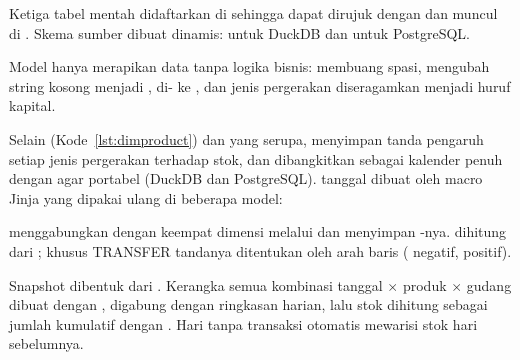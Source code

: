  Ketiga tabel mentah didaftarkan di  sehingga dapat dirujuk dengan  dan muncul di . Skema sumber dibuat dinamis:  untuk DuckDB dan  untuk PostgreSQL.


 Model  hanya merapikan data tanpa logika bisnis:  membuang spasi,  mengubah string kosong menjadi ,  di- ke , dan jenis pergerakan diseragamkan menjadi huruf kapital.


 Selain  (Kode~\ref{lst:dimproduct}) dan  yang serupa,  menyimpan tanda pengaruh setiap jenis pergerakan terhadap stok, dan  dibangkitkan sebagai kalender penuh dengan  agar portabel (DuckDB dan PostgreSQL).  tanggal dibuat oleh macro Jinja yang dipakai ulang di beberapa model:



  menggabungkan  dengan keempat dimensi melalui  dan menyimpan -nya.  dihitung dari ; khusus TRANSFER tandanya ditentukan oleh arah baris ( negatif,  positif).


 Snapshot dibentuk dari . Kerangka semua kombinasi tanggal $\times$ produk $\times$ gudang dibuat dengan , digabung dengan ringkasan harian, lalu stok dihitung sebagai jumlah kumulatif  dengan . Hari tanpa transaksi otomatis mewarisi stok hari sebelumnya.


